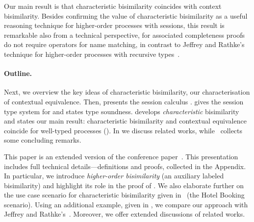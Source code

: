 Our main result is that characteristic  %
bisimilarity coincides with context bisimilarity.
Besides confirming the value of characteristic bisimilarity as a useful reasoning technique for 
higher-order processes with sessions,
this result is 
remarkable 
also from a technical perspective, for associated 
completeness proofs do not require 
operators for 
name matching,
in contrast to Jeffrey and Rathke's technique for higher-order processes
with recursive types~\cite{JeffreyR05}.




\paragraph{Outline.} 
Next,
we overview the
key ideas of characteristic bisimilarity, 
our 
characterisation of contextual equivalence.
Then,   presents 
the %
session calculus \HOp. 
 gives the session type system for \HOp
and states type soundness.
{} 
develops %
\emph{characteristic} bisimilarity and 
states our main result: characteristic bisimilarity and contextual equivalence coincide for 
well-typed \HOp processes ().
In  we discuss related works, while
~collects some concluding remarks. 

This paper is an extended version of the conference paper~\cite{kouzapas_et_al:LIPIcs:2015:5365}.
This presentation includes full technical details---definitions and proofs, collected in the Appendix.
In particular, we introduce \emph{higher-order bisimilarity} (an auxiliary labeled 
bisimilarity) 
and highlight its role
in the proof of . 
We also elaborate further  on the 
use case scenario 
for characteristic bisimilarity 
given in~\cite{kouzapas_et_al:LIPIcs:2015:5365} (the Hotel Booking scenario).
Using an additional example, given in  
, we compare our approach with Jeffrey and Rathke's~\cite{JeffreyR05}. 
Moreover, we offer extended discussions of related works.

